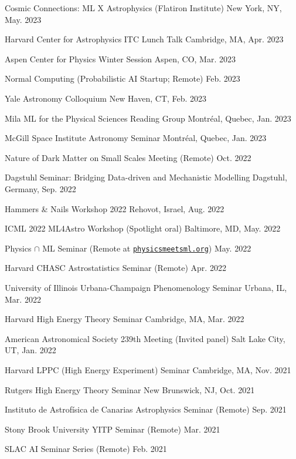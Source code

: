 \documentclass[letterpaper,11pt]{article}
\newenvironment{packed_itemize}{
\begin{itemize}[label=\raisebox{0.25ex}{\tiny$\bullet$}]
  \setlength{\itemsep}{4.0pt}
  \setlength{\parskip}{0pt}
  \setlength{\parsep}{0pt}}{\end{itemize}
}
\begin{document}
\begin{packed_itemize}
  \item Cosmic Connections: ML X Astrophysics (Flatiron Institute) \hfill New York, NY, May. 2023
  \item Harvard Center for Astrophysics ITC Lunch Talk  \hfill Cambridge, MA, Apr. 2023
  \item Aspen Center for Physics Winter Session \hfill Aspen, CO, Mar. 2023
  \item Normal Computing (Probabilistic AI Startup; Remote) \hfill Feb. 2023
  \item Yale Astronomy Colloquium \hfill New Haven, CT, Feb. 2023
  \item Mila ML for the Physical Sciences Reading Group \hfill Montr\'eal, Quebec, Jan. 2023
  \item McGill Space Institute Astronomy Seminar \hfill Montr\'eal, Quebec, Jan. 2023
  \item Nature of Dark Matter on Small Scales Meeting (Remote) \hfill  Oct. 2022
  \item Dagstuhl Seminar: Bridging Data-driven and Mechanistic Modelling \hfill Dagstuhl, Germany, Sep. 2022
  \item Hammers \& Nails Workshop 2022 \hfill Rehovot, Israel, Aug. 2022
  \item ICML 2022 ML4Astro Workshop (Spotlight oral) \hfill Baltimore, MD, May. 2022
  \item Physics $\cap$ ML Seminar (Remote at \href{http://www.physicsmeetsml.org//}{\texttt{physicsmeetsml.org}}) \hfill May. 2022
  \item Harvard CHASC Astrostatistics Seminar (Remote)  \hfill Apr. 2022
  \item University of Illinois Urbana-Champaign Phenomenology Seminar  \hfill Urbana, IL, Mar. 2022
  \item Harvard High Energy Theory Seminar \hfill Cambridge, MA, Mar. 2022
  \item American Astronomical Society 239th Meeting (Invited panel)  \hfill Salt Lake City, UT, Jan. 2022
  \item Harvard LPPC (High Energy Experiment) Seminar \hfill Cambridge, MA, Nov. 2021
  \item Rutgers High Energy Theory Seminar \hfill New Brunswick, NJ, Oct. 2021
  \item Instituto de Astrof\'{i}sica de Canarias Astrophysics Seminar (Remote) \hfill Sep. 2021
  \item Stony Brook University YITP Seminar (Remote) \hfill Mar. 2021
  \item SLAC AI Seminar Series (Remote) \hfill Feb. 2021

\end{packed_itemize}
\end{document}
